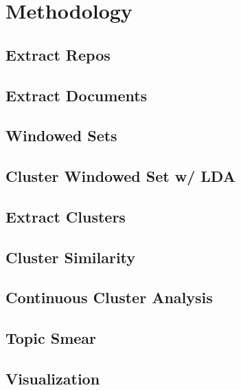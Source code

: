 \documentclass{report}
\begin{document}



\section{Methodology}

\subsection{Extract Repos}
\subsection{Extract Documents}
\subsection{Windowed Sets}
\subsection{Cluster Windowed Set w/ LDA}
\subsection{Extract Clusters}
\subsection{Cluster Similarity}
\subsection{Continuous Cluster Analysis}
\subsection{Topic Smear}
\subsection{Visualization}
\end{document}
